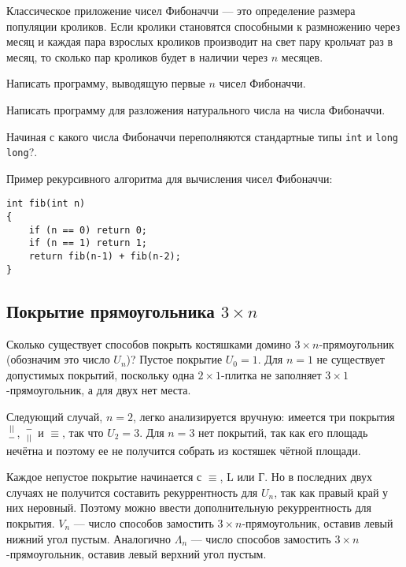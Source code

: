 Классическое приложение чисел Фибоначчи --- это определение размера популяции кроликов.
Если кролики становятся способными к размножению через месяц и каждая пара взрослых кроликов
производит на свет пару крольчат раз в месяц, то сколько пар кроликов будет в наличии
через $n$ месяцев.

\begin{task}
Написать программу, выводящую первые $n$ чисел Фибоначчи.
\end{task}

\begin{task}
Написать программу для разложения натурального числа на числа Фибоначчи.
\end{task}

\begin{task}
Начиная с какого числа Фибоначчи переполняются стандартные типы \texttt{int} и \texttt{long long}?.
\end{task}

Пример рекурсивного алгоритма для вычисления чисел Фибоначчи:

\begin{lstlisting}
int fib(int n)
{
    if (n == 0) return 0;
    if (n == 1) return 1;
    return fib(n-1) + fib(n-2);
}
\end{lstlisting}

\subsection{Покрытие прямоугольника $3\times n$}

Сколько существует способов покрыть костяшками домино $3 \times n$-прямоугольник
(обозначим это число $U_n$)? Пустое покрытие $U_0 = 1$. Для $n=1$ не существует допустимых
покрытий, поскольку одна $2\times 1$-плитка не заполняет $3 \times 1$-прямоугольник,
а для двух нет места.

Следующий случай, $n=2$, легко анализируется вручную: имеется три покрытия ${||}\atop{-}$,
${-}\atop{||}$ и $\equiv$, так что $U_2 = 3$. Для $n=3$ нет покрытий, так как его
площадь нечётна и поэтому ее не получится собрать из костяшек чётной площади.

Каждое непустое покрытие начинается с $\equiv$, L или Г. Но в последних двух случаях
не получится составить рекуррентность для $U_n$, так как правый край у них неровный.
Поэтому можно ввести дополнительную рекуррентность для покрытия. $V_n$  --- число
способов замостить $3\times n$-прямоугольник, оставив левый нижний угол пустым.
Аналогично $\Lambda_n$ --- число
способов замостить $3\times n$-прямоугольник, оставив левый верхний угол пустым.


